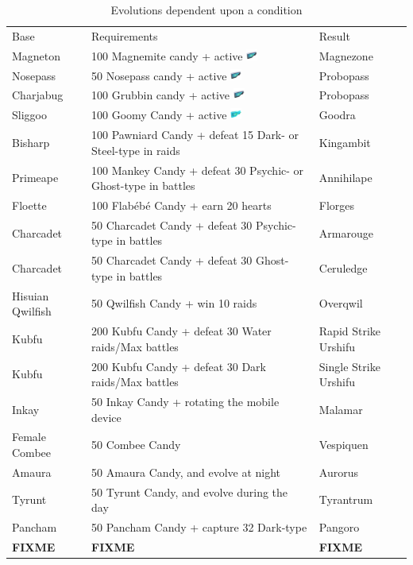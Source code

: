\begin{table}[ht]
\footnotesize
\begin{center}
  \begin{tabular}{lll}
    Base & Requirements & Result \\
    \Midrule
    Magneton & 100 Magnemite candy + active \includegraphics[width=1em,height=1em]{images/magneticlure.png} & Magnezone \\
    Nosepass & 50 Nosepass candy + active \includegraphics[width=1em,height=1em]{images/magneticlure.png} & Probopass \\
    Charjabug & 100 Grubbin candy + active \includegraphics[width=1em,height=1em]{images/magneticlure.png} & Probopass \\
    Sliggoo	& 100 Goomy Candy + active \includegraphics[width=1em,height=1em]{images/rainylure.png}& Goodra	\\
    Bisharp	& 100 Pawniard Candy + defeat 15 Dark- or Steel-type in raids & Kingambit	  \\
    Primeape & 100 Mankey Candy + defeat 30 Psychic- or Ghost-type in battles & Annihilape	\\
    Floette	& 100 Flabébé Candy + earn 20 hearts & Florges\\
    Charcadet	& 50 Charcadet Candy + defeat 30 Psychic-type in battles & Armarouge\\
    Charcadet	& 50 Charcadet Candy + defeat 30 Ghost-type in battles & Ceruledge\\
    Hisuian Qwilfish & 50 Qwilfish Candy + win 10 raids & Overqwil\\
    Kubfu	& 200 Kubfu Candy + defeat 30 Water raids/Max battles & Rapid Strike Urshifu\\
    Kubfu	& 200 Kubfu Candy + defeat 30 Dark raids/Max battles & Single Strike Urshifu\\
    Inkay	& 50 Inkay Candy + rotating the mobile device & Malamar \\
    Female Combee	& 50 Combee Candy & Vespiquen  	\\
    Amaura & 50 Amaura Candy, and evolve at night & Aurorus	    \\
    Tyrunt & 50 Tyrunt Candy, and evolve during the day & Tyrantrum	  \\
    Pancham	& 50 Pancham Candy + capture 32 Dark-type & Pangoro	    \\
    \textbf{FIXME} & \textbf{FIXME} & \textbf{FIXME}\\
  \end{tabular}
\end{center}
\caption{Evolutions dependent upon a condition}
\label{table:condevolutions}
\end{table}

